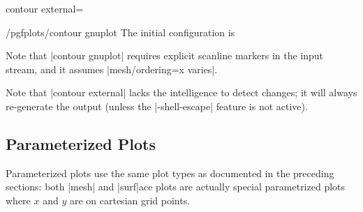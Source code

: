 {{\begin{plottype}[/pgfplots]{contour external=\textcolor{black}{}}
	\begin{stylekey}{/pgfplots/contour gnuplot}
		\label{key:pgfplots:contour:gnuplot}
		The initial configuration is
\begin{codeexample}
\end{codeexample}
	Note that |contour gnuplot| requires explicit scanline markers in the input stream, and it assumes |mesh/ordering=x varies|.
	\end{stylekey}

	Note that |contour external| lacks the intelligence to detect changes; it will always re-generate the output (unless the |-shell-escape| feature is not active).
\end{plottype}

% 
% 

}

\subsection{Parameterized Plots}
Parameterized plots use the same plot types as documented in the preceding sections: both |mesh| and |surf|ace plots are actually special parametrized plots where $x$ and $y$ are on cartesian grid points.

}
